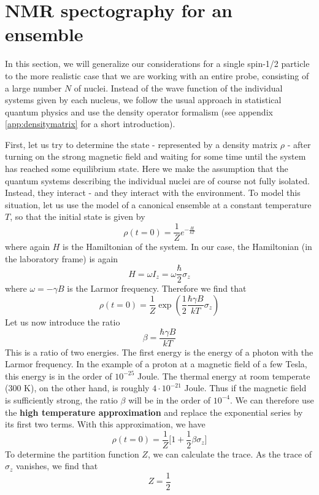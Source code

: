 \documentclass[a4paper, draft]{article}
\theoremstyle{own}
\theoremstyle{remark}
\begin{document}
\section{NMR spectography for an ensemble}

In this section, we will generalize our considerations for a single spin-1/2 particle to the more realistic case that we are working with an entire probe, consisting of a large number $N$ of nuclei. Instead of the wave function of the individual systems given by each nucleus, we follow the usual approach in statistical quantum physics and use the density operator formalism (see appendix \ref{app:densitymatrix} for a short introduction). 

First, let us try to determine the state - represented by a density matrix $\rho$ - after turning on the strong magnetic field and waiting for some time until the system has reached some equilibrium state. Here we make the assumption that the quantum systems describing the individual nuclei are of course not fully isolated. Instead, they interact - and they interact with the environment. To model this situation, let us use the model of a canonical ensemble at a constant temperature $T$, so that the initial state is given by
$$
\rho(t=0) = \frac{1}{Z} e^{-\frac{H}{kT}}
$$
where again $H$ is the Hamiltonian of the system. In our case, the Hamiltonian (in the laboratory frame) is again 
$$
H =  \omega I_z = \omega \frac{\hbar}{2} \sigma_z
$$
where $\omega = -\gamma B$ is the Larmor frequency. Therefore we find that
$$
\rho(t=0) = \frac{1}{Z} \exp (\frac{1}{2} \frac{\hbar \gamma B}{kT} \sigma_z)
$$
Let us now introduce the ratio
$$
\beta = \frac{\hbar \gamma B}{kT}
$$
This is a ratio of two energies. The first energy is the energy of a photon with the Larmor frequency. In the example of a proton at a magnetic field of a few Tesla, this energy is in the order of $10^{-25}$ Joule. The thermal energy at room temperate (300 K), on the other hand, is roughly $4 \cdot 10^{-21}$ Joule. Thus if the magnetic field is sufficiently strong, the ratio $\beta$ will be in the order of $10^{-4}$. We can therefore use the {\bf high temperature approximation} and replace the exponential series by its first two terms. With this approximation, we have
$$
\rho(t=0) = \frac{1}{Z} \big[ 1 + \frac{1}{2} \beta \sigma_z \big] 
$$ 
To determine the partition function $Z$, we can calculate the trace. As the trace of $\sigma_z$ vanishes, we find that 
$$
Z = \frac{1}{2}
$$
\end{document}
